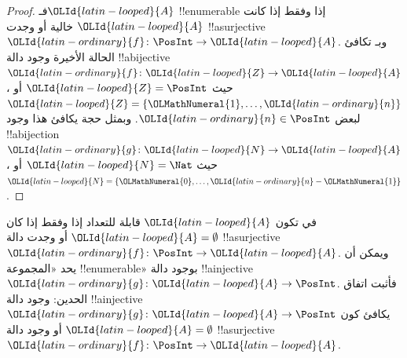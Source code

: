 \documentclass[../../../include/open-logic-section]{subfiles}
\begin{document}
\begin{proof}
فـ$\OLId{latin-looped}{A}$ !!{enumerable} إذا وفقط إذا كانت $\OLId{latin-looped}{A}$ خالية أو وجدت
!!a{surjective} $\OLId{latin-ordinary}{f}\colon \PosInt \to \OLId{latin-looped}{A}$. وبـ
تكافئ الحالة الأخيرة وجود دالة !!a{bijective}~$\OLId{latin-ordinary}{f}\colon \OLId{latin-looped}{Z} \to \OLId{latin-looped}{A}$،
حيث $\OLId{latin-looped}{Z} = \PosInt$ أو $\OLId{latin-looped}{Z} = \{\OLMathNumeral{1}, \dots, \OLId{latin-ordinary}{n}\}$ لبعض $\OLId{latin-ordinary}{n} \in \PosInt$.
وبمثل حجة  يكافئ هذا وجود
!!a{bijection} $\OLId{latin-ordinary}{g}\colon \OLId{latin-looped}{N} \to \OLId{latin-looped}{A}$، حيث $\OLId{latin-looped}{N} = \Nat$ أو $\OLId{latin-looped}{N} = \{\OLMathNumeral{0}, \dots, \OLId{latin-ordinary}{n}-\OLMathNumeral{1}\}$.
\end{proof}

\begin{prob}
في  تكون $\OLId{latin-looped}{A}$ قابلة للتعداد
إذا وفقط إذا كان $\OLId{latin-looped}{A} = \emptyset$ أو وجدت دالة !!a{surjective}
$\OLId{latin-ordinary}{f}\colon \PosInt \to \OLId{latin-looped}{A}$. ويمكن أن يحد «المجموعة !!{enumerable}»
بوجود دالة !!a{injective} $\OLId{latin-ordinary}{g}\colon \OLId{latin-looped}{A} \to \PosInt$.
فأثبت اتفاق الحدين: وجود دالة !!a{injective} $\OLId{latin-ordinary}{g}\colon \OLId{latin-looped}{A} \to \PosInt$
يكافئ كون $\OLId{latin-looped}{A} = \emptyset$ أو وجود دالة !!a{surjective} $\OLId{latin-ordinary}{f}\colon \PosInt \to \OLId{latin-looped}{A}$.
\end{prob}
\end{document}

